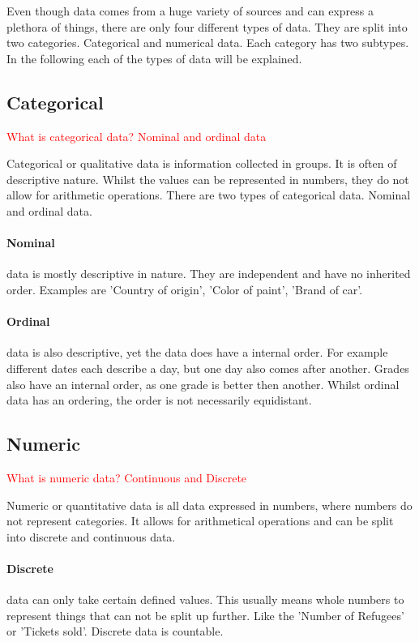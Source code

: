 Even though data comes from a huge variety of sources and can express a plethora of things, there are only four different types of data. They are split into two categories. Categorical and numerical data. Each category has two subtypes. In the following each of the types of data will be explained.

\subsection{Categorical}
\textcolor{red}{
What is categorical data? Nominal and ordinal data}

Categorical or qualitative data is information collected in groups. It is often of descriptive nature. Whilst the values can be represented in numbers, they do not allow for arithmetic operations.
There are two types of categorical data. Nominal and ordinal data.

\paragraph{Nominal}
data is mostly descriptive in nature. They are independent and have no inherited order. Examples are 'Country of origin', 'Color of paint', 'Brand of car'.

\paragraph{Ordinal}
data is also descriptive, yet the data does have a internal order. For example different dates each describe a day, but one day also comes after another. Grades also have an internal order, as one grade is better then another. Whilst ordinal data has an ordering, the order is not necessarily equidistant.

\subsection{Numeric}
\textcolor{red}{
What is numeric data? Continuous and Discrete}

Numeric or quantitative data is all data expressed in numbers, where numbers do not represent categories. It allows for arithmetical operations and can be split into discrete and continuous data.

\paragraph{Discrete}
data can only take certain defined values. This usually means whole numbers to represent things that can not be split up further. Like the 'Number of Refugees' or 'Tickets sold'. Discrete data is countable.

